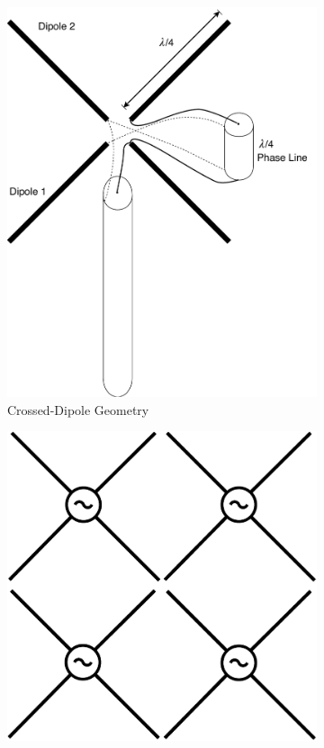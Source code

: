 \documentclass[11pt]{witseiepaper}
\begin{document}
\begin{figure}[htb]
    \centering
    \begin{subfigure}{.3\textwidth}
        \centering
            \includegraphics[width=\textwidth]{Crossed-Dipole.pdf}
            \caption{Crossed-Dipole Geometry}
            \label{fig:Crossed-DipoleGeometry} 
        \end{subfigure}%
        \begin{subfigure}{.3\textwidth}
            \centering
            \includegraphics[width=\textwidth]{ArrayGeometry.pdf}

\end{subfigure}
\end{figure}
\end{document}
